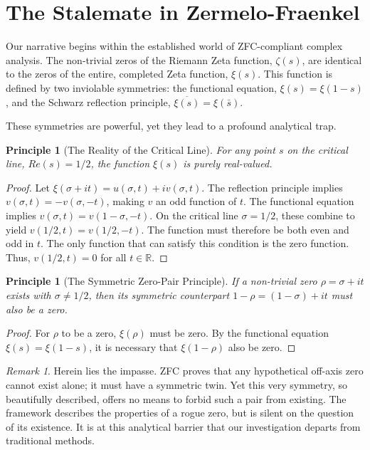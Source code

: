 \documentclass{article}
\theoremstyle{plain}
\newtheorem{principle}[theorem]{Principle}
\theoremstyle{definition}
\theoremstyle{remark}
\newtheorem*{remark}{Remark}
\begin{document}
\section{The Stalemate in Zermelo-Fraenkel}
\label{sec:impasse}

Our narrative begins within the established world of ZFC-compliant complex analysis. The non-trivial zeros of the Riemann Zeta function, $\zeta(s)$, are identical to the zeros of the entire, completed Zeta function, $\xi(s)$. This function is defined by two inviolable symmetries: the functional equation, $\xi(s) = \xi(1-s)$ , and the Schwarz reflection principle, $\overline{\xi(s)} = \xi(\bar{s})$.

These symmetries are powerful, yet they lead to a profound analytical trap.

\begin{principle}[The Reality of the Critical Line]
For any point $s$ on the critical line, $Re(s)=1/2$, the function $\xi(s)$ is purely real-valued.
\end{principle}
\begin{proof}
Let $\xi(\sigma+it) = u(\sigma,t) + iv(\sigma,t)$. The reflection principle implies $v(\sigma,t) = -v(\sigma,-t)$, making $v$ an odd function of $t$. The functional equation implies $v(\sigma,t) = v(1-\sigma,-t)$. On the critical line $\sigma=1/2$, these combine to yield $v(1/2, t) = v(1/2, -t)$. The function must therefore be both even and odd in $t$. The only function that can satisfy this condition is the zero function. Thus, $v(1/2, t) = 0$ for all $t \in \mathbb{R}$.
\end{proof}

\begin{principle}[The Symmetric Zero-Pair Principle]
If a non-trivial zero $\rho = \sigma + it$ exists with $\sigma \neq 1/2$, then its symmetric counterpart $1-\rho = (1-\sigma)+it$ must also be a zero.
\end{principle}
\begin{proof}
For $\rho$ to be a zero, $\xi(\rho)$ must be zero. By the functional equation $\xi(s) = \xi(1-s)$, it is necessary that $\xi(1-\rho)$ also be zero.
\end{proof}

\begin{remark}
Herein lies the impasse. ZFC proves that any hypothetical off-axis zero cannot exist alone; it must have a symmetric twin. Yet this very symmetry, so beautifully described, offers no means to forbid such a pair from existing. The framework describes the properties of a rogue zero, but is silent on the question of its existence. It is at this analytical barrier that our investigation departs from traditional methods.
\end{remark}
\end{document}
